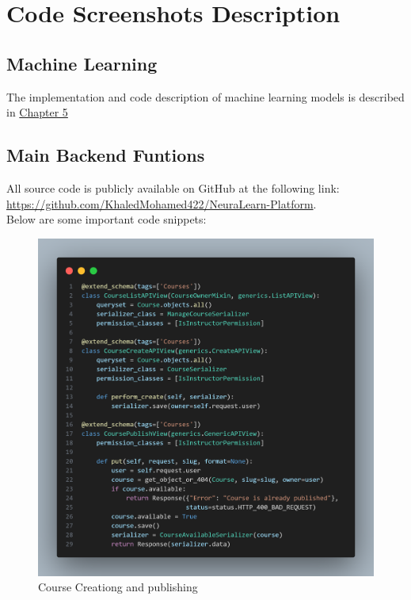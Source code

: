 \section{Code Screenshots Description}

\FloatBarrier
\subsection{Machine Learning}
The implementation and code description of machine learning models is described in \hyperref[ch:modeling]{Chapter 5}

\newpage

\FloatBarrier
\subsection{Main Backend Funtions}

All source code is publicly available on GitHub at the following link: \url{https://github.com/KhaledMohamed422/NeuraLearn-Platform}.\\
Below are some important code snippets:

\begin{figure}[h!]
	\centering
	\includegraphics[max height=\textheight,max width=\textwidth]{figures/srccode/code.png}
	\caption{Course Creationg and publishing}
\end{figure}

